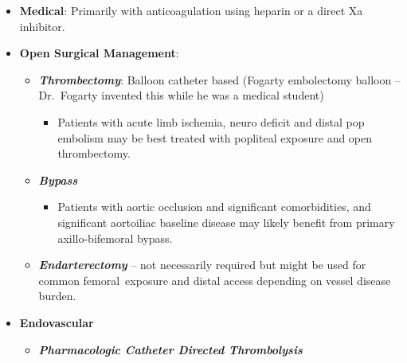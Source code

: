 \documentclass[
]{book}
\providecommand{\tightlist}{%
  \setlength{\itemsep}{0pt}\setlength{\parskip}{0pt}}
\begin{document}
\begin{itemize}
\item
  \textbf{Medical}: Primarily with anticoagulation using heparin or a
  direct Xa inhibitor.
\item
  \textbf{Open Surgical Management}:

  \begin{itemize}
  \item
    \textbf{\emph{Thrombectomy}}: Balloon catheter based (Fogarty embolectomy
    balloon -- Dr.~Fogarty invented this while he was a medical
    student)

    \begin{itemize}
    \tightlist
    \item
      Patients with acute limb ischemia, neuro deficit and distal
      pop embolism may be best treated with popliteal exposure and
      open thrombectomy. \citep{darwoodSurgeryThrombolysisInitial2018, kempeResultsSurgicalManagement2014}
    \end{itemize}
  \item
    \textbf{\emph{Bypass}}

    \begin{itemize}
    \tightlist
    \item
      Patients with aortic occlusion and significant
      comorbidities, and significant aortoiliac baseline disease
      may likely benefit from primary axillo-bifemoral bypass.
      \citep{mohapatraRiskFactorsPerioperative2018}
    \end{itemize}
  \item
    \textbf{\emph{Endarterectomy}} -- not necessarily required but might be used for
    common femoral~exposure and distal access depending on vessel disease
    burden.
  \end{itemize}
\item
  \textbf{Endovascular}

  \begin{itemize}
  \item
    \textbf{\emph{Pharmacologic Catheter Directed Thrombolysis}}


\end{itemize}
\end{itemize}
\end{document}
